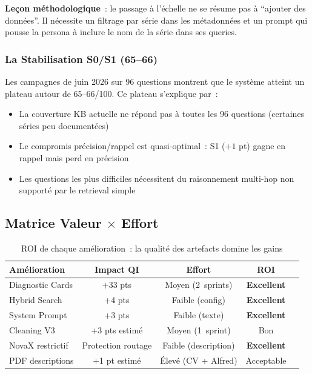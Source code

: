 \textbf{Leçon méthodologique}~: le passage à l'échelle ne se résume pas à ``ajouter des données''. Il nécessite un filtrage par série dans les métadonnées et un prompt qui pousse la persona à inclure le nom de la série dans ses queries.

\subsubsection{La Stabilisation S0/S1 (65--66)}

Les campagnes de juin 2026 sur 96 questions montrent que le système atteint un plateau autour de 65--66/100. Ce plateau s'explique par~:
\begin{itemize}
  \item La couverture KB actuelle ne répond pas à toutes les 96 questions (certaines séries peu documentées)
  \item Le compromis précision/rappel est quasi-optimal~: S1 ($+1$ pt) gagne en rappel mais perd en précision
  \item Les questions les plus difficiles nécessitent du raisonnement multi-hop non supporté par le retrieval simple
\end{itemize}

\subsection{Matrice Valeur $\times$ Effort}
\label{sec:matrice_roi}

\begin{table}[H]
\centering
\begin{tabular}{lcccl}
\toprule
\textbf{Amélioration} & \textbf{Impact QI} & \textbf{Effort} & \textbf{ROI} \\
\midrule
Diagnostic Cards & +33 pts & Moyen (2~sprints) & \textcolor{green!60!black}{\textbf{Excellent}} \\
Hybrid Search & +4 pts & Faible (config) & \textcolor{green!60!black}{\textbf{Excellent}} \\
System Prompt & +3 pts & Faible (texte) & \textcolor{green!60!black}{\textbf{Excellent}} \\
Cleaning V3 & +3 pts estimé & Moyen (1~sprint) & Bon \\
NovaX restrictif & Protection routage & Faible (description) & \textcolor{green!60!black}{\textbf{Excellent}} \\
PDF descriptions & +1 pt estimé & Élevé (CV + Alfred) & Acceptable \\
\bottomrule
\end{tabular}
\caption{ROI de chaque amélioration~: la qualité des artefacts domine les gains}
\label{tab:roi_pipeline}
\end{table}

